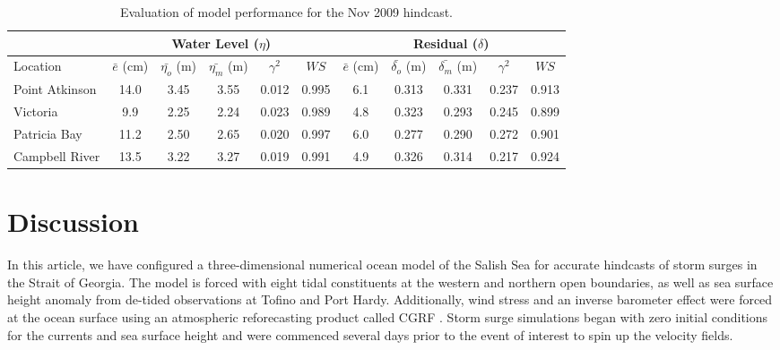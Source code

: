 \documentclass[pdftex,10pt]{article}
\begin{document}
\begin{table}[h]
\centering 
\begin{tabular}{|l |c c c c c | c c c c c|} 
\hline 
& \multicolumn{5}{|c|}{Water Level ($\eta$)}        & \multicolumn{5}{|c|}{Residual ($\delta$)} \\ 
\hline 
Location       & $\bar{e}$ (cm) & $\bar{\eta_{o}}$ (m) & $\bar{\eta_{m}}$ (m) & $\gamma^2$ & $WS$   & $\bar{e}$ (cm) & $\bar{\delta_{o}}$ (m) & $\bar{\delta_{m}}$ (m) & $\gamma^2$ & $WS$ \\
\hline 
Point Atkinson & 14.0           &  3.45                & 3.55                 &   0.012    & 0.995  &  6.1           &  0.313                 & 0.331                  &  0.237     & 0.913 \\
Victoria       &  9.9           &  2.25                & 2.24                 &   0.023    & 0.989  &  4.8           &  0.323                 & 0.293                  &  0.245     & 0.899 \\
Patricia Bay   & 11.2           &  2.50                & 2.65                 &   0.020    & 0.997  &  6.0           &  0.277                 & 0.290                  &  0.272     & 0.901 \\
Campbell River & 13.5           &  3.22                & 3.27                 &   0.019    & 0.991  &  4.9           &  0.326                 & 0.314                  &  0.217     & 0.924 \\
\hline 
\end{tabular}
\caption{Evaluation of model performance for the Nov 2009 hindcast.}
\label{tab:nov2009stat} 
\end{table}




\section{Discussion}\label{sec:diss}
In this article, we have configured a three-dimensional numerical ocean model of the Salish Sea for accurate hindcasts of storm surges in the Strait of Georgia. The model is forced with eight tidal constituents at the western and northern open boundaries, as well as sea surface height anomaly from de-tided observations at Tofino and Port Hardy. Additionally, wind stress and an inverse barometer effect were forced at the ocean surface using an atmospheric reforecasting product called CGRF \citep{smith2014new}. Storm surge simulations began with zero initial conditions for the currents and sea surface height and were commenced several days prior to the event of interest to spin up the velocity fields. 
\end{document}
